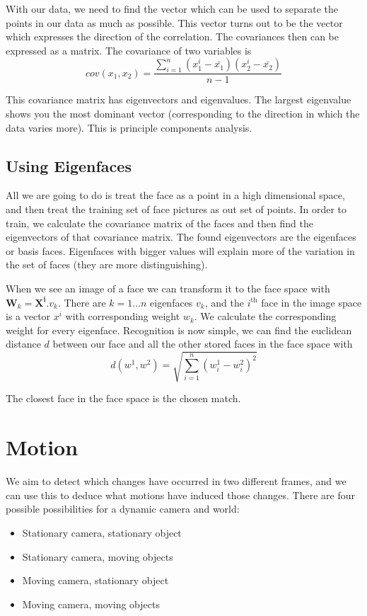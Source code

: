 \documentclass{article}
\begin{document}
	With our data, we need to find the vector which can be used to separate the points in our data as much as possible. This vector turns out to be the vector which expresses the direction of the correlation. The covariances then can be expressed as a matrix. The covariance of two variables is
	\[ cov(x_{1}, x_{2}) = \frac{\sum_{i=1}^{n}(x_{1}^{i} - \bar{x_{1}})(x_{2}^{i} - \bar{x_{2}})}{n - 1} \]	
	
	This covariance matrix has eigenvectors and eigenvalues. The largest eigenvalue shows you the most dominant vector (corresponding to the direction in which the data varies more). This is principle components analysis.
	
	\subsection{Using Eigenfaces}
	All we are going to do is treat the face as a point in a high dimensional space, and then treat the training set of face pictures as out set of points. In order to train, we calculate the covariance matrix of the faces and then find the eigenvectors of that covariance matrix. The found eigenvectors are the eigenfaces or basis faces. Eigenfaces with bigger values will explain more of the variation in the set of faces (they are more distinguishing).
	
	\par
	When we see an image of a face we can transform it to the face space with $\mathbf{W}_{k} = \mathbf{X}^{\mathbf{i}} . \mathit{v}_{k}$. There are $k=1...n$ eigenfaces $v_{k}$, and the $i^{\text{th}}$ face in the image space is a vector $x^{i}$ with corresponding weight $w_{k}$. We calculate the corresponding weight for every eigenface. Recognition is now simple, we can find the euclidean distance $d$ between our face and all the other stored faces in the face space with \[ d(w^{1}, w^{2}) = \sqrt{\sum_{i=1}^{n}(w_{i}^{1} - w_{i}^{2})^{2}} \]
	
	The closest face in the face space is the chosen match.
	\section{Motion}
	We aim to detect which changes have occurred in two different frames, and we can use this to deduce what motions have induced those changes. There are four possible possibilities for a dynamic camera and world:
	\begin{itemize}
		\item Stationary camera, stationary object
		\item Stationary camera, moving objects
		\item Moving camera, stationary object
		\item Moving camera, moving objects
	\end{itemize}
	
\end{document}
